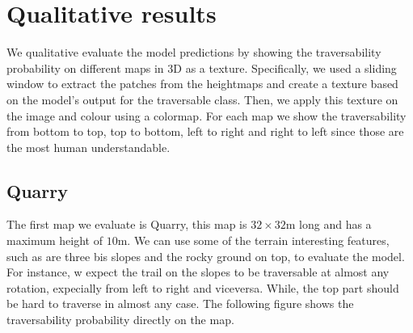 \documentclass[../document.tex]{subfiles}
\begin{document}
\section{Qualitative results}
We qualitative evaluate the model predictions by showing the traversability probability on different maps in 3D as a texture. Specifically, we used a sliding window to extract the patches from the heightmaps and create a texture based on the model's output for the traversable class. Then, we apply this texture on the image and colour using a colormap. For each map we show the traversability from bottom to top, top to bottom, left to right and right to left since those are the most human understandable.
\subsection{Quarry}
The first map we evaluate is Quarry, this map is $32\times 32$m long and has a maximum height of $10$m. We can use some of the terrain interesting features, such as are three bis slopes and the rocky ground on top, to evaluate the model. For instance, w expect the trail on the slopes to be traversable at almost any rotation, expecially from left to right and viceversa. While, the top part should be hard to traverse in almost any case. The following figure shows the traversability probability directly on the map. 
\end{document}
